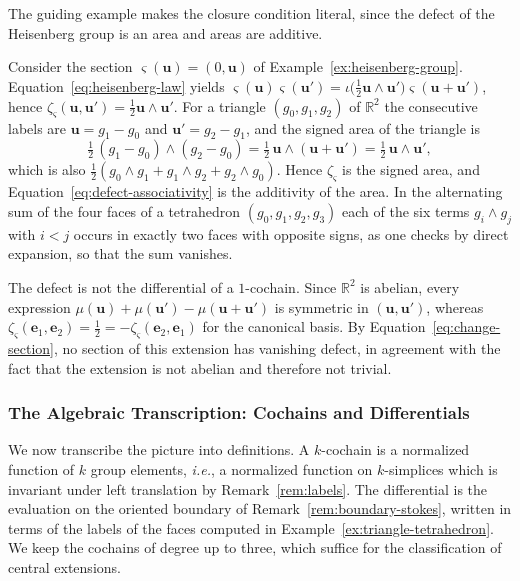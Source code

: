 The guiding example makes the closure condition literal, since the defect of the Heisenberg group is an area and areas are additive.

\begin{example}\label{ex:area-defect}
	Consider the section $\varsigma(\mathbf{u})=(0,\mathbf{u})$ of Example~\ref{ex:heisenberg-group}. Equation~\eqref{eq:heisenberg-law} yields $\varsigma(\mathbf{u})\varsigma(\mathbf{u}')=\iota\big(\tfrac12\mathbf{u}\wedge\mathbf{u}'\big)\varsigma(\mathbf{u}+\mathbf{u}')$, hence $\zeta_\varsigma(\mathbf{u},\mathbf{u}')=\tfrac12\mathbf{u}\wedge\mathbf{u}'$. For a triangle $(g_0,g_1,g_2)$ of $\mathbb{R}^2$ the consecutive labels are $\mathbf{u}=g_1-g_0$ and $\mathbf{u}'=g_2-g_1$, and the signed area of the triangle is
	\begin{equation*}
		\tfrac12\,(g_1-g_0)\wedge(g_2-g_0)=\tfrac12\,\mathbf{u}\wedge(\mathbf{u}+\mathbf{u}')=\tfrac12\,\mathbf{u}\wedge\mathbf{u}',
	\end{equation*}
	which is also $\tfrac12(g_0\wedge g_1+g_1\wedge g_2+g_2\wedge g_0)$. Hence $\zeta_\varsigma$ is the signed area, and Equation~\eqref{eq:defect-associativity} is the additivity of the area. In the alternating sum of the four faces of a tetrahedron $(g_0,g_1,g_2,g_3)$ each of the six terms $g_i\wedge g_j$ with $i<j$ occurs in exactly two faces with opposite signs, as one checks by direct expansion, so that the sum vanishes.
	
	The defect is not the differential of a $1$-cochain. Since $\mathbb{R}^2$ is abelian, every expression $\mu(\mathbf{u})+\mu(\mathbf{u}')-\mu(\mathbf{u}+\mathbf{u}')$ is symmetric in $(\mathbf{u},\mathbf{u}')$, whereas $\zeta_\varsigma(\mathbf{e}_1,\mathbf{e}_2)=\tfrac12=-\zeta_\varsigma(\mathbf{e}_2,\mathbf{e}_1)$ for the canonical basis. By Equation~\eqref{eq:change-section}, no section of this extension has vanishing defect, in agreement with the fact that the extension is not abelian and therefore not trivial.
\end{example}

\subsubsection*{The Algebraic Transcription: Cochains and Differentials}

We now transcribe the picture into definitions. A $k$-cochain is a normalized function of $k$ group elements, \textit{i.e.}, a normalized function on $k$-simplices which is invariant under left translation by Remark~\ref{rem:labels}. The differential is the evaluation on the oriented boundary of Remark~\ref{rem:boundary-stokes}, written in terms of the labels of the faces computed in Example~\ref{ex:triangle-tetrahedron}. We keep the cochains of degree up to three, which suffice for the classification of central extensions.

